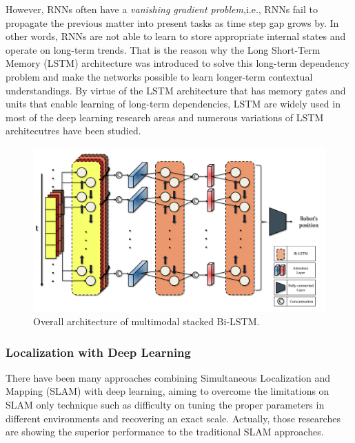 \documentclass[letterpaper, 10 pt, conference]{ieeeconf}  %
\begin{document}
However, RNNs often have a \textit{vanishing gradient problem},i.e., RNNs fail to propagate the previous matter into present tasks as time step gap grows by. In other words, RNNs are not able to learn to store appropriate internal states and operate on long-term trends. That is the reason why the Long Short-Term Memory (LSTM) architecture was introduced to solve this long-term dependency problem and make the networks possible to learn longer-term contextual understandings\cite{hochreiter1997long}.
By virtue of the LSTM architecture that has memory gates and units that enable learning of long-term dependencies\cite{zaremba2014learning}, LSTM are widely used in most of the deep learning research areas and numerous variations of LSTM architecutres have been studied.

\begin{figure}[ht]
	
	\centering
	\includegraphics[height=10 cm]{CE554_networks}
	
	\label{fig:example}
	
	\caption{Overall architecture of multimodal stacked Bi-LSTM. }
	
\end{figure}


\subsubsection{Localization with Deep Learning}
There have been many approaches combining Simultaneous Localization and Mapping (SLAM) with deep learning, aiming to overcome the limitations on SLAM only technique such as difficulty on tuning the proper parameters in different environments and recovering an exact scale. Actually, those researches are showing the superior performance to the traditional SLAM approaches.
\end{document}
